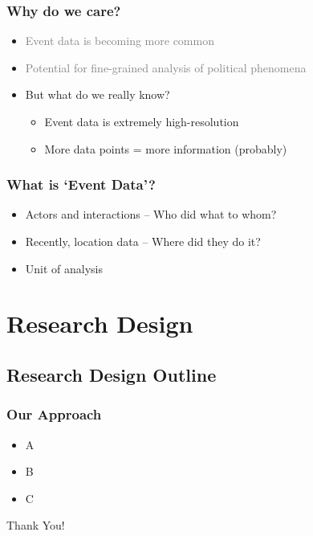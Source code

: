\documentclass{beamer}
\begin{document}
\begin{frame}
\frametitle{Why do we care?}
\begin{itemize}
\item \textcolor{gray}{Event data is becoming more common}
\vspace {2 mm}
\item \textcolor{gray}{Potential for fine-grained analysis of political phenomena}
\vspace {2 mm}
\item But what do we really know?
\begin{itemize}
\item Event data is extremely high-resolution
\item More data points = more information (probably)
\end{itemize}
\end{itemize}
\end{frame}


\begin{frame}
\frametitle{What is `Event Data'?}
\begin{itemize}
\item Actors and interactions -- Who did what to whom?
\vspace {5 mm}
\item Recently, location data -- Where did they do it?
\vspace {5 mm}
\item Unit of analysis

\end{itemize}
\end{frame}

\section{Research Design}
\subsection{Research Design Outline}
\begin{frame}
\frametitle{Our Approach}
\begin{itemize}
\item A
\vspace {5 mm}
\item B
\vspace {5 mm}
\item C

\end{itemize}
\end{frame}



\begin{frame}
\Huge{\centerline{Thank You!}}
\end{frame}

\end{document}
